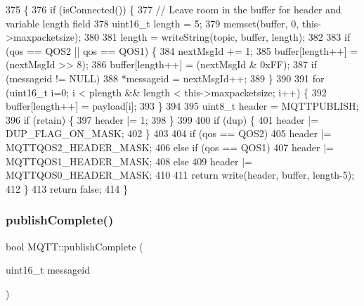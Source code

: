 \begin{DoxyCode}
375                                                                                                            
                                        \{
376     \textcolor{keywordflow}{if} (isConnected()) \{
377         \textcolor{comment}{// Leave room in the buffer for header and variable length field}
378         uint16\_t length = 5;
379         memset(buffer, 0, this->maxpacketsize);
380 
381         length = writeString(topic, buffer, length);
382 
383         \textcolor{keywordflow}{if} (qos == QOS2 || qos == QOS1) \{
384             nextMsgId += 1;
385             buffer[length++] = (nextMsgId >> 8);
386             buffer[length++] = (nextMsgId & 0xFF);
387             \textcolor{keywordflow}{if} (messageid != NULL)
388                 *messageid = nextMsgId++;
389         \}
390 
391         \textcolor{keywordflow}{for} (uint16\_t i=0; i < plength && length < this->maxpacketsize; i++) \{
392             buffer[length++] = payload[i];
393         \}
394 
395         uint8\_t header = MQTTPUBLISH;
396         \textcolor{keywordflow}{if} (retain) \{
397             header |= 1;
398         \}
399 
400         \textcolor{keywordflow}{if} (dup) \{
401             header |= DUP_FLAG_ON_MASK;
402         \}
403 
404         \textcolor{keywordflow}{if} (qos == QOS2)
405             header |= MQTTQOS2_HEADER_MASK;
406         \textcolor{keywordflow}{else} \textcolor{keywordflow}{if} (qos == QOS1)
407             header |= MQTTQOS1_HEADER_MASK;
408         \textcolor{keywordflow}{else}
409             header |= MQTTQOS0_HEADER_MASK;
410 
411         \textcolor{keywordflow}{return} write(header, buffer, length-5);
412     \}
413     \textcolor{keywordflow}{return} \textcolor{keyword}{false};
414 \}
\end{DoxyCode}
\mbox{\label{class_m_q_t_t_a98364d0b5900925a0466b64b84396b18}} 
\subsubsection{publish\+Complete()}
{\footnotesize\ttfamily bool M\+Q\+T\+T\+::publish\+Complete (\begin{DoxyParamCaption}\item[{uint16\+\_\+t}]{messageid }\end{DoxyParamCaption})\hspace{0.3cm}{\ttfamily [private]}}



